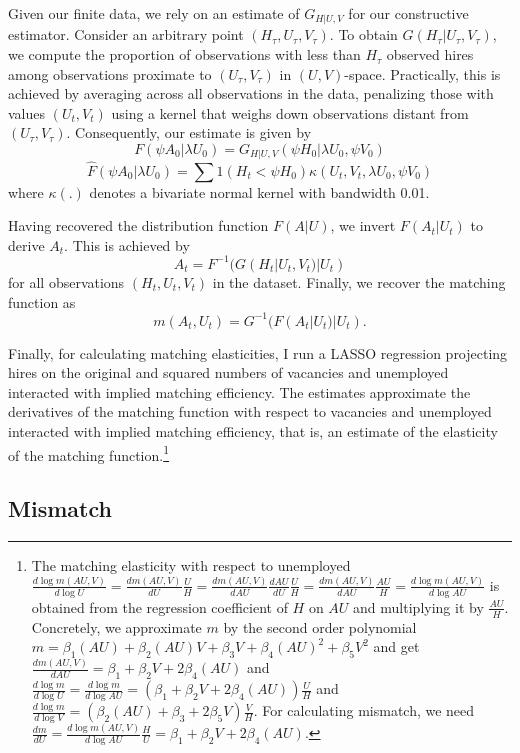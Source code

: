 \documentclass[12pt]{article}
\begin{document}
Given our finite data, we rely on an estimate of $G_{H|U,V}$ for our constructive estimator. Consider an arbitrary point $(H_\tau, U_\tau, V_\tau)$. To obtain $G(H_\tau|U_\tau, V_\tau)$, we compute the proportion of observations with less than $H_\tau$ observed hires among observations proximate to $(U_\tau, V_\tau)$ in $(U, V)$-space. Practically, this is achieved by averaging across all observations in the data, penalizing those with values $(U_t, V_t)$ using a kernel that weighs down observations distant from $(U_\tau, V_\tau)$. Consequently, our estimate is given by
\[
F(\psi A_0|\lambda U_0) = G_{H|U,V}(\psi H_0|\lambda U_0, \psi V_0)
\]
\[
\hat{F}(\psi A_0|\lambda U_0) = \sum 1(H_t < \psi H_0) \kappa(U_t, V_t, \lambda U_0, \psi V_0)
\]
where $\kappa(.)$ denotes a bivariate normal kernel with bandwidth 0.01.

Having recovered the distribution function $F(A|U)$, we invert $F(A_t|U_t)$ to derive $A_t$. This is achieved by
\[
A_t = F^{-1}(G(H_t|U_t, V_t)|U_t)
\]
for all observations $(H_t, U_t, V_t)$ in the dataset. Finally, we recover the matching function as
\[
m(A_t, U_t) = G^{-1}(F(A_t|U_t)|U_t).
\]


Finally, for calculating matching elasticities, I run a LASSO regression projecting hires on the original and squared numbers of vacancies and unemployed interacted with implied matching efficiency.
The estimates approximate the derivatives of the matching function with respect to vacancies and unemployed interacted with implied matching efficiency, that is, an estimate of
the elasticity of the matching function.\footnote{The matching elasticity with respect to unemployed $\frac{d \log m(AU,V)}{d \log U}=\frac{d m(AU,V)}{d U}\frac{U}{H}=\frac{d m(AU,V)}{d AU}\frac{d AU}{dU}\frac{U}{H}=\frac{d m(AU,V)}{d AU}\frac{AU}{H}=\frac{d \log m(AU,V)}{d \log AU}$ is obtained from the regression coefficient of $H$ on $AU$ and multiplying it by $\frac{AU}{H}$. Concretely, we approximate $m$ by the second order polynomial $m=\beta_1 (AU) + \beta_2(AU)V+\beta_3 V + \beta_4 (AU)^2 + \beta_5 V^2$ and get $\frac{d m(AU,V)}{d AU}=\beta_1 + \beta_2V + 2\beta_4 (AU) $ and $\frac{d\log m}{d\log U}=\frac{d\log m}{d\log AU}=(\beta_1 + \beta_2V + 2\beta_4 (AU))\frac{U}{H}$ and $\frac{d\log m}{d\log V}=(\beta_2 (AU) + \beta_3 + 2\beta_5 V)\frac{V}{H}$. For calculating mismatch, we need $\frac{dm}{dU}=\frac{d \log m(AU,V)}{d \log AU}\frac{H}{U}=\beta_1 + \beta_2V + 2\beta_4 (AU)$.}

\subsection{Mismatch}\label{sec:mismatch_computation}
\end{document}
